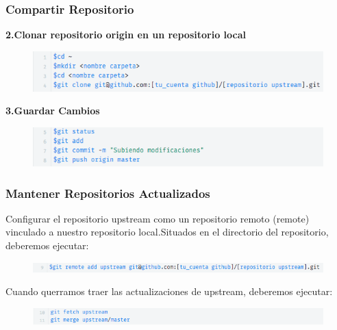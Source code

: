 \begin{frame}[fragile]
    \frametitle{Compartir Repositorio}
    \textbf{2.Clonar repositorio origin en un repositorio local}
    \begin{figure}
        \includegraphics[width=1\textwidth]{Images/7.png}
    \end{figure}

    \textbf{3.Guardar Cambios}
    \begin{figure}
        \includegraphics[width=1\textwidth]{Images/8.png}
    \end{figure}
\end{frame}

\begin{frame}[fragile]
    \frametitle{Mantener Repositorios Actualizados}
    Configurar el repositorio upstream como un repositorio remoto (remote)
    vinculado a nuestro repositorio local.Situados en el directorio del 
    repositorio, deberemos ejecutar:
    \begin{figure}
        \includegraphics[width=1\textwidth]{Images/9.png}
    \end{figure}
    Cuando querramos traer las actualizaciones de upstream, deberemos 
    ejecutar:
    \begin{figure}
        \includegraphics[width=1\textwidth]{Images/10.png}
    \end{figure}
\end{frame}
